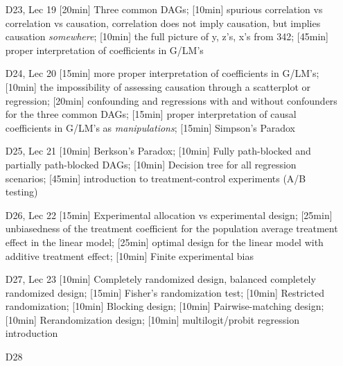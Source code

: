 \begin{enumerate}
\item[D23, Lec 19] [20min] Three common DAGs; [10min] spurious correlation vs correlation vs causation, correlation does not imply causation, but implies causation \emph{somewhere}; [10min] the full picture of y, z's, x's from 342; [45min] proper interpretation of coefficients in G/LM's

\item[D24, Lec 20] [15min] more proper interpretation of coefficients in G/LM's; [10min] the impossibility of assessing causation through a scatterplot or regression; [20min] confounding and regressions with and without confounders for the three common DAGs; [15min] proper interpretation of causal coefficients in G/LM's as \emph{manipulations}; [15min] Simpson's Paradox


\item[D25, Lec 21] [10min] Berkson's Paradox; [10min] Fully path-blocked and partially path-blocked DAGs; [10min] Decision tree for all regression scenarios; [45min] introduction to treatment-control experiments (A/B testing)




\item[D26, Lec 22] [15min] Experimental allocation vs experimental design; [25min] unbiasedness of the treatment coefficient for the population average treatment effect in the linear model; [25min] optimal design for the linear model with additive treatment effect; [10min] Finite experimental bias


\item[D27, Lec 23] [10min] Completely randomized design, balanced completely randomized design; [15min] Fisher's randomization test; [10min] Restricted randomization; [10min] Blocking design; [10min] Pairwise-matching design; [10min] Rerandomization design; [10min] multilogit/probit regression introduction


\item[D28] 

\end{enumerate}

